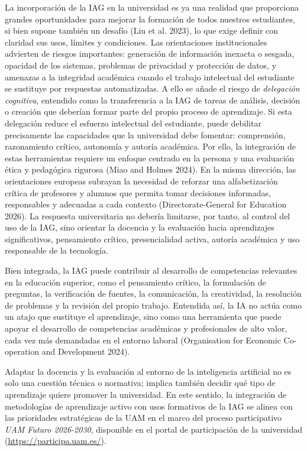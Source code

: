 \documentclass[
  11pt,
  a4paper,
  twoside]{scrreprt}
\begin{document}
La incorporación de la IAG en la universidad es ya una realidad que
proporciona grandes oportunidades para mejorar la formación de todos
nuestros estudiantes, si bien supone también un desafío (Liu et al.
2023), lo que exige definir con claridad sus usos, límites y
condiciones. Las orientaciones institucionales advierten de riesgos
importantes: generación de información inexacta o sesgada, opacidad de
los sistemas, problemas de privacidad y protección de datos, y amenazas
a la integridad académica cuando el trabajo intelectual del estudiante
se sustituye por respuestas automatizadas. A ello se añade el riesgo de
\emph{delegación cognitiva}, entendido como la transferencia a la IAG de
tareas de análisis, decisión o creación que deberían formar parte del
propio proceso de aprendizaje. Si esta delegación reduce el esfuerzo
intelectual del estudiante, puede debilitar precisamente las capacidades
que la universidad debe fomentar: comprensión, razonamiento crítico,
autonomía y autoría académica. Por ello, la integración de estas
herramientas requiere un enfoque centrado en la persona y una evaluación
ética y pedagógica rigurosa (Miao and Holmes 2024). En la misma
dirección, las orientaciones europeas subrayan la necesidad de reforzar
una alfabetización crítica de profesores y alumnos que permita tomar
decisiones informadas, responsables y adecuadas a cada contexto
(Directorate-General for Education 2026). La respuesta universitaria no
debería limitarse, por tanto, al control del uso de la IAG, sino
orientar la docencia y la evaluación hacia aprendizajes significativos,
pensamiento crítico, presencialidad activa, autoría académica y uso
responsable de la tecnología.

Bien integrada, la IAG puede contribuir al desarrollo de competencias
relevantes en la educación superior, como el pensamiento crítico, la
formulación de preguntas, la verificación de fuentes, la comunicación,
la creatividad, la resolución de problemas y la revisión del propio
trabajo. Entendida así, la IA no actúa como un atajo que sustituye el
aprendizaje, sino como una herramienta que puede apoyar el desarrollo de
competencias académicas y profesionales de alto valor, cada vez más
demandadas en el entorno laboral (Organisation for Economic Co-operation
and Development 2024).

Adaptar la docencia y la evaluación al entorno de la inteligencia
artificial no es solo una cuestión técnica o normativa; implica también
decidir qué tipo de aprendizaje quiere promover la universidad. En este
sentido, la integración de metodologías de aprendizaje activo con usos
formativos de la IAG se alinea con las prioridades estratégicas de la
UAM en el marco del proceso participativo \emph{UAM Futuro 2026-2030},
disponible en el portal de participación de la universidad
(\url{https://participa.uam.es/}).
\end{document}
